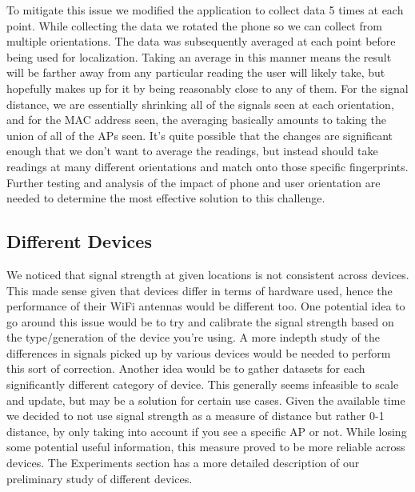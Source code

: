 \documentclass[11pt]{article}
\begin{document}
To mitigate this issue we modified the application to collect data 5 times at each point. While collecting the data we rotated the phone so we can collect from multiple orientations. The data was subsequently averaged at each point before being used for localization. Taking an average in this manner means the result will be farther away from any particular reading the user will likely take, but hopefully makes up for it by being reasonably close to any of them. For the signal distance, we are essentially shrinking all of the signals seen at each orientation, and for the MAC address seen, the averaging basically amounts to taking the union of all of the APs seen. It’s quite possible that the changes are significant enough that we don’t want to average the readings, but instead should take readings at many different orientations and match onto those specific fingerprints. Further testing and analysis of the impact of phone and user orientation are needed to determine the most effective solution to this challenge.\\

\subsection{Different Devices}
We noticed that signal strength at given locations is not consistent across devices. This made sense given that devices differ in terms of hardware used, hence the performance of their WiFi antennas would be different too. One potential idea to go around this issue would be to try and calibrate the signal strength based on the type/generation of the device you’re using. A more indepth study of the differences in signals picked up by various devices would be needed to perform this sort of correction. Another idea would be to gather datasets for each significantly different category of device. This generally seems infeasible to scale and update, but may be a solution for certain use cases. Given the available time we decided to not use signal strength as a measure of distance but rather 0-1 distance, by only taking into account if you see a specific AP or not. While losing some potential useful information, this measure proved to be more reliable across devices. The Experiments section has a more detailed description of our preliminary study of different devices.
\end{document}
